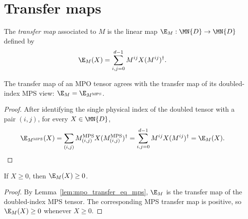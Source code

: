 \section{Transfer maps}

\begin{definition}\label{def:mpo_transfer_map}
    \leanok
    The \emph{transfer map} associated to $M$ is the linear map
    $\E_M:\MN{D}\to\MN{D}$ defined by
    \begin{align}
        \E_M(X)
         & =\sum_{i,j=0}^{d-1}M^{ij}X(M^{ij})^\dagger.
        \label{eq:mpdo_transfer_map}
    \end{align}
\end{definition}

\begin{lemma}\label{lem:mpo_transfer_eq_mps}
    \leanok
    The transfer map of an MPO tensor agrees with the transfer map of its
    doubled-index MPS view: $\E_M=\E_{M^{\mathrm{MPS}}}$.
\end{lemma}

\begin{proof}
    \leanok
    After identifying the single physical index of the doubled tensor with a
    pair $(i,j)$, for every $X\in\MN{D}$,
    \begin{align}
        \E_{M^{\mathrm{MPS}}}(X)
         & =
        \sum_{(i,j)}
        M^{\mathrm{MPS}}_{(i,j)}X
        (M^{\mathrm{MPS}}_{(i,j)})^\dagger
        =
        \sum_{i,j=0}^{d-1}M^{ij}X(M^{ij})^\dagger
        =
        \E_M(X).
        \notag
    \end{align}
\end{proof}

\begin{lemma}\label{thm:mpo_transfer_pos}
    \leanok
    If $X\ge0$, then $\E_M(X)\ge0$.
\end{lemma}

\begin{proof}
    \leanok
    By Lemma~\ref{lem:mpo_transfer_eq_mps}, $\E_M$ is the transfer map of the
    doubled-index MPS tensor. The corresponding MPS transfer map is positive,
    so $\E_M(X)\ge0$ whenever $X\ge0$.
\end{proof}

